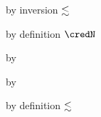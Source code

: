 {\begin{lamportproof*}
    \begin{pfproof}
        \begin{pfproof}
          by inversion $\lesssim$
        \end{pfproof}
        \begin{pfproof}
          by definition $\credN$
        \end{pfproof}
        \begin{pfproof}
          by 
        \end{pfproof}
        \begin{pfproof}
          by \pfih
        \end{pfproof}
      \qedstep
        \begin{pfproof}
          by definition $\lesssim$
        \end{pfproof}
    \end{pfproof}


\end{lamportproof*}}
